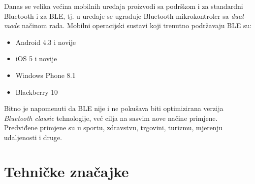 Danas se velika većina mobilnih uređaja proizvodi sa podrškom i za standardni Bluetooth i za BLE, tj. u uređaje se ugrađuje Bluetooth mikrokontroler sa \textit{dual-mode} načinom rada. 
Mobilni operacijski sustavi koji trenutno podržavaju BLE su:

\begin{itemize}
    \item Android 4.3 i novije
    \item iOS 5 i novije
    \item Windows Phone 8.1
    \item Blackberry 10
\end{itemize}
Bitno je napomenuti da BLE nije i ne pokušava biti optimizirana verzija \textit{Bluetooth classic} tehnologije, već cilja na sasvim nove načine primjene. 
Predviđene primjene su u sportu, zdravstvu, trgovini, turizmu, mjerenju udaljenosti i druge.


\section*{Tehničke značajke}

